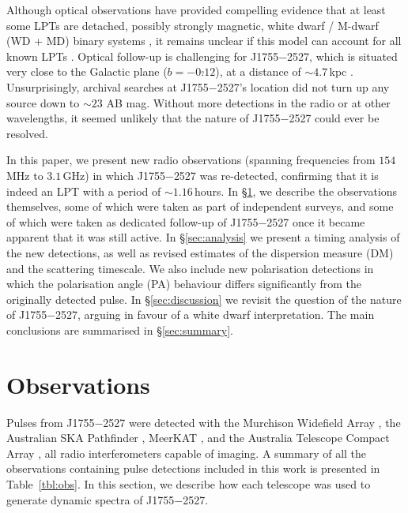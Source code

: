 \documentclass[fleqn,usenatbib]{mnras}
\newcommand{\src}{J1755$-$2527}
\newcommand{\Tab}{Table}
\begin{document}
Although optical observations have provided compelling evidence that at least some LPTs are detached, possibly strongly magnetic, white dwarf / M-dwarf (WD + MD) binary systems \citep{deRuiter2025,2024ApJ...976L..21H,2025A&A...695L...8R}, it remains unclear if this model can account for all known LPTs \citep[e.g.][]{2022ApJ...940...72R,Lee2025}.
Optical follow-up is challenging for \src{}, which is situated very close to the Galactic plane ($b = -0\overset{\circ}{.}12$), at a distance of ${\sim}4.7\,$kpc .
Unsurprisingly, archival searches at \src{}'s location did not turn up any source down to ${\sim}23$ AB mag.
Without more detections in the radio or at other wavelengths, it seemed unlikely that the nature of \src{} could ever be resolved.

In this paper, we present new radio observations (spanning frequencies from $154\,$MHz to $3.1\,$GHz) in which \src{} was re-detected, confirming that it is indeed an LPT with a period of ${\sim}1.16\,$hours.
In \S\ref{sec:observations}, we describe the observations themselves, some of which were taken as part of independent surveys, and some of which were taken as dedicated follow-up of \src{} once it became apparent that it was still active.
In \S\ref{sec:analysis} we present a timing analysis of the new detections, as well as revised estimates of the dispersion measure (DM) and the scattering timescale.
We also include new polarisation detections in which the polarisation angle (PA) behaviour differs significantly from the originally detected pulse.
In \S\ref{sec:discussion} we revisit the question of the nature of \src{}, arguing in favour of a white dwarf interpretation.
The main conclusions are summarised in \S\ref{sec:summary}.

\section{Observations} \label{sec:observations}

Pulses from \src{} were detected with the Murchison Widefield Array \citep[MWA;][]{Tingay2013}, the Australian SKA Pathfinder \citep[ASKAP;][]{2021PASA...38....9H}, MeerKAT \citep{2016mks..confE...1J}, and the Australia Telescope Compact Array \citep[ATCA;][]{cabb}, all radio interferometers capable of imaging.
A summary of all the observations containing pulse detections included in this work is presented in \Tab~\ref{tbl:obs}.
In this section, we describe how each telescope was used to generate dynamic spectra of \src{}.
\end{document}
